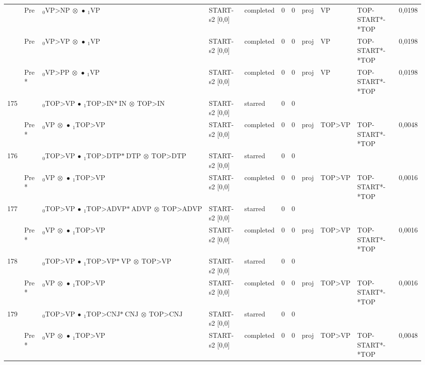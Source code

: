 \documentclass[10pt]{article}
\begin{document}
\begin{longtable}[htbp]{lllllllllll}
 & Pre & $ {}_0 \textrm{VP>NP} \  \otimes \  \bullet \ {}_{1} \textrm{VP} $ & START-s2 [0,0] & completed & 0 & 0 & proj & VP & TOP-START*-*TOP & 0,0198 \\ 
 & Pre & $ {}_0 \textrm{VP>VP} \  \otimes \  \bullet \ {}_{1} \textrm{VP} $ & START-s2 [0,0] & completed & 0 & 0 & proj & VP & TOP-START*-*TOP & 0,0198 \\ 
 & Pre *& $ {}_0 \textrm{VP>PP} \  \otimes \  \bullet \ {}_{1} \textrm{VP} $ & START-s2 [0,0] & completed & 0 & 0 & proj & VP & TOP-START*-*TOP & 0,0198 \\ 
175 & & $ {}_0 \textrm{TOP>VP} \  \bullet \ {}_{1} \textrm{TOP>IN*} \ \textrm{IN} \  \otimes \ \textrm{TOP>IN} $ & START-s2 [0,0] & starred & 0 & 0 & & & & \\ 
 & Pre *& $ {}_0 \textrm{VP} \  \otimes \  \bullet \ {}_{1} \textrm{TOP>VP} $ & START-s2 [0,0] & completed & 0 & 0 & proj & TOP>VP & TOP-START*-*TOP & 0,0048 \\ 
176 & & $ {}_0 \textrm{TOP>VP} \  \bullet \ {}_{1} \textrm{TOP>DTP*} \ \textrm{DTP} \  \otimes \ \textrm{TOP>DTP} $ & START-s2 [0,0] & starred & 0 & 0 & & & & \\ 
 & Pre *& $ {}_0 \textrm{VP} \  \otimes \  \bullet \ {}_{1} \textrm{TOP>VP} $ & START-s2 [0,0] & completed & 0 & 0 & proj & TOP>VP & TOP-START*-*TOP & 0,0016 \\ 
177 & & $ {}_0 \textrm{TOP>VP} \  \bullet \ {}_{1} \textrm{TOP>ADVP*} \ \textrm{ADVP} \  \otimes \ \textrm{TOP>ADVP} $ & START-s2 [0,0] & starred & 0 & 0 & & & & \\ 
 & Pre *& $ {}_0 \textrm{VP} \  \otimes \  \bullet \ {}_{1} \textrm{TOP>VP} $ & START-s2 [0,0] & completed & 0 & 0 & proj & TOP>VP & TOP-START*-*TOP & 0,0016 \\ 
178 & & $ {}_0 \textrm{TOP>VP} \  \bullet \ {}_{1} \textrm{TOP>VP*} \ \textrm{VP} \  \otimes \ \textrm{TOP>VP} $ & START-s2 [0,0] & starred & 0 & 0 & & & & \\ 
 & Pre *& $ {}_0 \textrm{VP} \  \otimes \  \bullet \ {}_{1} \textrm{TOP>VP} $ & START-s2 [0,0] & completed & 0 & 0 & proj & TOP>VP & TOP-START*-*TOP & 0,0016 \\ 
179 & & $ {}_0 \textrm{TOP>VP} \  \bullet \ {}_{1} \textrm{TOP>CNJ*} \ \textrm{CNJ} \  \otimes \ \textrm{TOP>CNJ} $ & START-s2 [0,0] & starred & 0 & 0 & & & & \\ 
 & Pre *& $ {}_0 \textrm{VP} \  \otimes \  \bullet \ {}_{1} \textrm{TOP>VP} $ & START-s2 [0,0] & completed & 0 & 0 & proj & TOP>VP & TOP-START*-*TOP & 0,0048 \\ 

\end{longtable}
\end{document}
